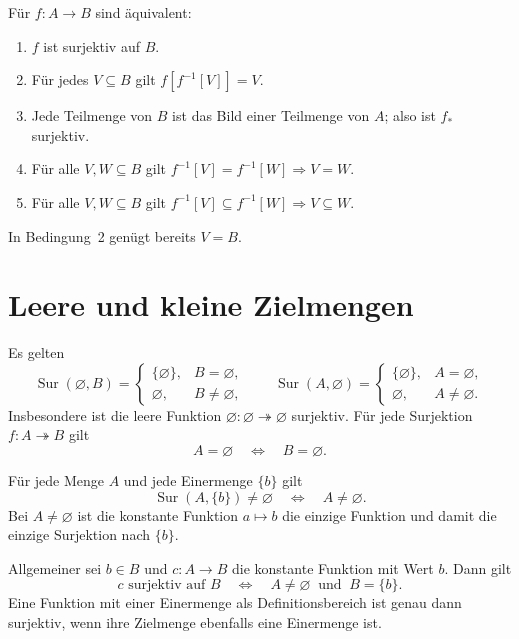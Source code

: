 \begin{theorem}
\label{b07guide:thm:setcriteria}
Für $f\colon A\to B$ sind äquivalent:
\begin{enumerate}
\item $f$ ist surjektiv auf $B$.
\item Für jedes $V\subseteq B$ gilt $f[f^{-1}[V]]=V$.
\item Jede Teilmenge von $B$ ist das Bild einer Teilmenge von $A$;
      also ist $f_*$ surjektiv.
\item Für alle $V,W\subseteq B$ gilt
      $f^{-1}[V]=f^{-1}[W]\Rightarrow V=W$.
\item Für alle $V,W\subseteq B$ gilt
      $f^{-1}[V]\subseteq f^{-1}[W]\Rightarrow V\subseteq W$.
\end{enumerate}
In Bedingung~2 genügt bereits $V=B$.
\end{theorem}

\section{Leere und kleine Zielmengen}

\begin{theorem}
\label{b07guide:thm:empty}
Es gelten
\[
 \operatorname{Sur}(\varnothing,B)=
 \begin{cases}
 \{\varnothing\},& B=\varnothing,\\
 \varnothing,& B\ne\varnothing,
 \end{cases}
 \qquad
 \operatorname{Sur}(A,\varnothing)=
 \begin{cases}
 \{\varnothing\},& A=\varnothing,\\
 \varnothing,& A\ne\varnothing.
 \end{cases}
\]
Insbesondere ist die leere Funktion
$\varnothing\colon\varnothing\twoheadrightarrow\varnothing$
surjektiv. Für jede Surjektion $f\colon A\twoheadrightarrow B$ gilt
\[
 A=\varnothing\quad\Longleftrightarrow\quad B=\varnothing.
\]
\end{theorem}

\begin{theorem}
\label{b07guide:thm:constant}
Für jede Menge $A$ und jede Einermenge $\{b\}$ gilt
\[
 \operatorname{Sur}(A,\{b\})\ne\varnothing
 \quad\Longleftrightarrow\quad A\ne\varnothing.
\]
Bei $A\ne\varnothing$ ist die konstante Funktion $a\mapsto b$
die einzige Funktion und damit die einzige Surjektion nach $\{b\}$.

Allgemeiner sei $b\in B$ und $c\colon A\to B$ die konstante
Funktion mit Wert $b$. Dann gilt
\[
 c\text{ surjektiv auf }B
 \quad\Longleftrightarrow\quad
 A\ne\varnothing\ \text{ und }\ B=\{b\}.
\]
Eine Funktion mit einer Einermenge als Definitionsbereich ist
genau dann surjektiv, wenn ihre Zielmenge ebenfalls eine Einermenge ist.
\end{theorem}